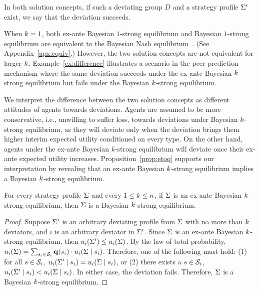 In both solution concepts, if such a deviating group $D$ and a strategy profile $\Sigma'$ exist, we say that the deviation succeeds.

When $k = 1$, both ex-ante Bayesian $1$-strong equilibrium and Bayesian $1$-strong equilibrium are equivalent to the Bayesian Nash equilibrium~\citep{Harsanyi67}. (See Appendix~\ref{apx:equiv}.) However, the two solution concepts are not equivalent for larger $k$. Example~\ref{ex:difference} illustrates a scenario in the peer prediction mechanism where the same deviation succeeds under the ex-ante Bayesian $k$-strong equilibrium but fails under the Bayesian $k$-strong equilibrium. 

We interpret the difference between the two solution concepts as different attitudes of agents towards deviations. Agents are assumed to be more conservative, i.e., unwilling to suffer loss, towards deviations under Bayesian $k$-strong equilibrium, as they will deviate only when the deviation brings them higher interim expected utility conditioned on every type. On the other hand, agents under the ex-ante Bayesian $k$-strong equilibrium will deviate once their ex-ante expected utility increases.  Proposition~\ref{prop:etoq} supports our interpretation by revealing that an ex-ante Bayesian $k$-strong equilibrium implies a Bayesian $k$-strong equilibrium. 

\begin{prop}
\label{prop:etoq}
    For every strategy profile $\Sigma$ and every $1\le k \le n$, if $\Sigma$ is an ex-ante Bayesian $k$-strong equilibrium, then $\Sigma$ is a Bayesian $k$-strong equilibrium. 
\end{prop}
\begin{proof}
    Suppose $\Sigma'$ is an arbitrary deviating profile from $\Sigma$ with no more than $k$ deviators, and $i$ is an arbitrary deviator in $\Sigma'$. 
    Since $\Sigma$ is an ex-ante Bayesian $k$-strong equilibrium, then $u_i (\Sigma') \le u_i (\Sigma) $. By the law of total probability,  
    $u_i(\Sigma) = \sum_{s_i \in \mathcal{S}_i} \mathbf{q}(s_i)\cdot u_i(\Sigma \mid s_i)$. 
    Therefore, one of the following must hold: (1) for all $s\in \mathcal{S}_i$, $u_i (\Sigma' \mid s_i) = u_i (\Sigma \mid s_i)$, or (2) there exists a $s\in\mathcal{S}_i$, $u_i (\Sigma' \mid s_i) < u_i (\Sigma \mid s_i)$. In either case, the deviation fails. Therefore, $\Sigma$ is a Bayesian $k$-strong equilibrium. 
\end{proof}


